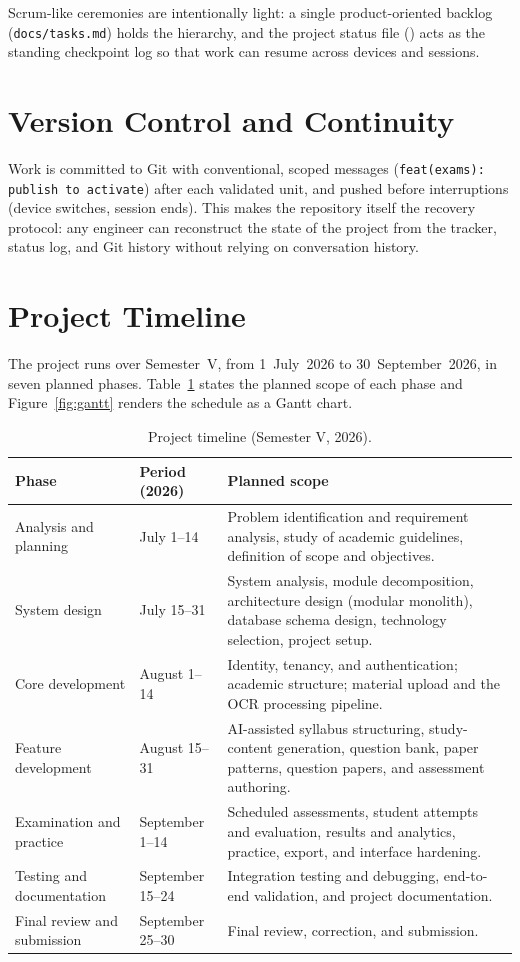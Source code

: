\noindent Scrum-like ceremonies are intentionally light: a single
product-oriented backlog (\texttt{docs/tasks.md}) holds the hierarchy, and the
project status file (\texttt{}) acts as the standing
checkpoint log so that work can resume across devices and sessions.

\section{Version Control and Continuity}

\noindent Work is committed to Git with conventional, scoped messages
(\texttt{feat(exams): publish to activate}) after each validated unit, and
pushed before interruptions (device switches, session ends). This makes the
repository itself the recovery protocol: any engineer can reconstruct the
state of the project from the tracker, status log, and Git history without
relying on conversation history.

\section{Project Timeline}

The project runs over Semester~V, from 1~July~2026 to 30~September~2026, in
seven planned phases. Table~\ref{tab:timeline} states the planned scope of each
phase and Figure~\ref{fig:gantt} renders the schedule as a Gantt chart.

\begin{table}[htbp]
\centering
\small
\begin{tabular}{@{}p{3.0cm}p{2.8cm}p{8.2cm}@{}}
\toprule
\textbf{Phase} & \textbf{Period (2026)} & \textbf{Planned scope} \\
\midrule
Analysis and planning & July 1--14 & Problem identification and requirement
analysis, study of academic guidelines, definition of scope and objectives. \\
System design & July 15--31 & System analysis, module decomposition,
architecture design (modular monolith), database schema design, technology
selection, project setup. \\
Core development & August 1--14 & Identity, tenancy, and authentication;
academic structure; material upload and the OCR processing pipeline. \\
Feature development & August 15--31 & AI-assisted syllabus structuring,
study-content generation, question bank, paper patterns, question papers, and
assessment authoring. \\
Examination and practice & September 1--14 & Scheduled assessments, student
attempts and evaluation, results and analytics, practice, export, and
interface hardening. \\
Testing and documentation & September 15--24 & Integration testing and
debugging, end-to-end validation, and project documentation. \\
Final review and submission & September 25--30 & Final review, correction, and
submission. \\
\bottomrule
\end{tabular}
\caption{Project timeline (Semester V, 2026).}
\label{tab:timeline}
\end{table}

